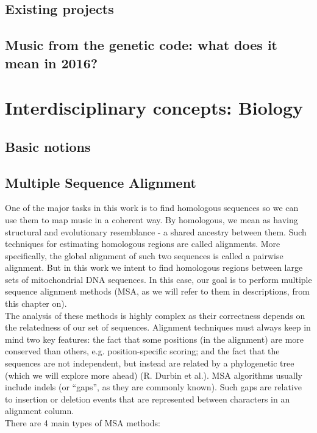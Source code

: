 \documentclass[11pt,twoside,a4paper]{report}
\begin{document}
\subsection{Existing projects}
\subsection{Music from the genetic code: what does it mean in 2016?}

\section{Interdisciplinary concepts: Biology}
\subsection{Basic notions}
\subsection{Multiple Sequence Alignment}
One of the major tasks in this work is to find homologous sequences so we can use them to map music in a coherent way. By homologous, we mean as having structural and evolutionary resemblance - a shared ancestry between them. \cite[chapter, p.~215]{bio} Such techniques for estimating homologous regions are called alignments. More specifically, the global alignment of such two sequences is called a pairwise alignment. But in this work we intent to find homologous regions between large sets of mitochondrial DNA sequences. In this case, our goal is to perform multiple sequence alignment methods (MSA, as we will refer to them in descriptions, from this chapter on).\\
The analysis of these methods is highly complex as their correctness depends on the relatedness of our set of sequences. Alignment techniques must always keep in mind two key features: the fact that some positions (in the alignment) are more conserved than others, e.g. position-specific scoring; and the fact that the sequences are not independent, but instead are related by a phylogenetic tree (which we will explore more ahead) (R. Durbin et al.). MSA algorithms usually include indels (or ``gaps'', as they are commonly known). Such gaps are relative to insertion or deletion events that are represented between characters in an alignment column.\\
There are 4 main types of MSA methods:
\end{document}

